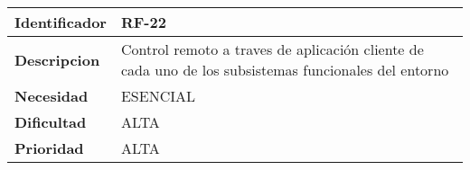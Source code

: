 \begin{center}
    \begin{tabular}{|p{2.6cm}|p{12cm}|}
    \hline
    \textbf{Identificador} & RF-22\\
    \hline
    \textbf{Descripcion} & Control remoto a traves de aplicación cliente de cada uno de los subsistemas funcionales del entorno\\
    \hline
    \textbf{Necesidad} & ESENCIAL\\
    \hline
    \textbf{Dificultad} & ALTA\\
    \hline
    \textbf{Prioridad} & ALTA\\
    \hline
    \end{tabular}
\end{center}
